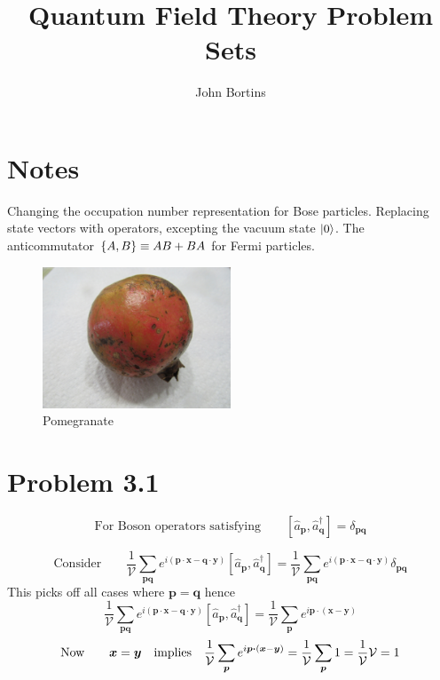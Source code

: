 \documentclass{amsart}
\title{Quantum Field Theory Problem Sets}
\author{John Bortins}
\begin{document}
 
\maketitle{}

\section*{Notes}
Changing the occupation number representation for Bose particles. Replacing state vectors with operators, excepting the vacuum state $\ket{0}$. The anticommutator $\qty{A,B}\equiv AB+BA$ for Fermi particles.

\begin{figure}[H]
    \centering
    \includegraphics[width=0.5\textwidth]{IMG_0873}
    \caption{Pomegranate}
    \label{fig:awesome_image}
\end{figure}


\section*{Problem 3.1}

\[\text{For Boson operators satisfying}\qquad[\hat{a}_{\boldsymbol{p}},\hat{a}^\dagger_{\boldsymbol{q}}]  = \delta_{\boldsymbol{pq}}  \]

\[\text{Consider}\qquad \frac{1}{\mathcal{V}}\sum_{\boldsymbol{pq}}e^{i(\boldsymbol{p\cdot x}-\boldsymbol{q\cdot y})}[\hat{a}_{\boldsymbol{p}},\hat{a}^\dagger_{\boldsymbol{q}}]=\frac{1}{\mathcal{V}}\sum_{\boldsymbol{pq}}e^{i(\boldsymbol{p\cdot x}-\boldsymbol{q\cdot y})}\delta_{\boldsymbol{pq}}  \]
This picks off all cases where $\boldsymbol{p}=\boldsymbol{q}$ hence
\[\frac{1}{\mathcal{V}}\sum_{\boldsymbol{pq}}e^{i(\boldsymbol{p\cdot x}-\boldsymbol{q\cdot y})}[\hat{a}_{\boldsymbol{p}},\hat{a}^\dagger_{\boldsymbol{q}}]=\frac{1}{\mathcal{V}}\sum_{\boldsymbol{p}}e^{i\boldsymbol{p\cdot} (\boldsymbol{x}-\boldsymbol{y}) } \]
\[\text{Now}\qquad \boldsymbol{x}=\boldsymbol{y}\qq{implies} \frac{1}{\mathcal{V}}\sum_{\boldsymbol{p}}e^{i\boldsymbol{p\cdot} (\boldsymbol{x}-\boldsymbol{y})}=\frac{1}{\mathcal{V}}\sum_{\boldsymbol{p}}1=\frac{1}{\mathcal{V}}\mathcal{V}=1 \]
\end{document}
